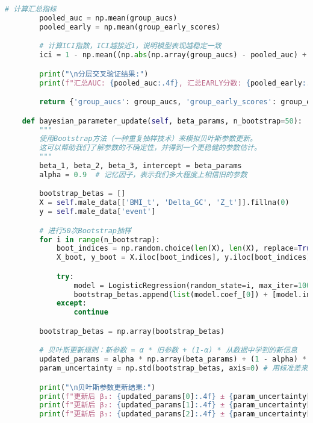 \documentclass[UTF8, a4paper, 11pt]{ctexart}
\begin{document}
\begin{lstlisting}[language=Python, caption={问题三的解决方案脚本。}]
        # 计算汇总指标
        pooled_auc = np.mean(group_aucs)
        pooled_early = np.mean(group_early_scores)

        # 计算ICI指数，ICI越接近1，说明模型表现越稳定一致
        ici = 1 - np.mean((np.abs(np.array(group_aucs) - pooled_auc) + np.abs(np.array(group_early_scores) - pooled_early)) / (pooled_auc + pooled_early))

        print("\n分层交叉验证结果:")
        print(f"汇总AUC: {pooled_auc:.4f}, 汇总EARLY分数: {pooled_early:.4f}, 组间一致性指数(ICI): {ici:.4f}")

        return {'group_aucs': group_aucs, 'group_early_scores': group_early_scores, 'pooled_auc': pooled_auc, 'pooled_early': pooled_early, 'ici': ici}

    def bayesian_parameter_update(self, beta_params, n_bootstrap=50):
        """
        使用Bootstrap方法（一种重复抽样技术）来模拟贝叶斯参数更新。
        这可以帮助我们了解参数的不确定性，并得到一个更稳健的参数估计。
        """
        beta_1, beta_2, beta_3, intercept = beta_params
        alpha = 0.9  # 记忆因子，表示我们多大程度上相信旧的参数

        bootstrap_betas = []
        X = self.male_data[['BMI_t', 'Delta_GC', 'Z_t']].fillna(0)
        y = self.male_data['event']

        # 进行50次Bootstrap抽样
        for i in range(n_bootstrap):
            boot_indices = np.random.choice(len(X), len(X), replace=True)
            X_boot, y_boot = X.iloc[boot_indices], y.iloc[boot_indices]

            try:
                model = LogisticRegression(random_state=i, max_iter=1000).fit(X_boot, y_boot)
                bootstrap_betas.append(list(model.coef_[0]) + [model.intercept_[0]])
            except:
                continue

        bootstrap_betas = np.array(bootstrap_betas)

        # 贝叶斯更新规则：新参数 = α * 旧参数 + (1-α) * 从数据中学到的新信息
        updated_params = alpha * np.array(beta_params) + (1 - alpha) * np.mean(bootstrap_betas, axis=0)
        param_uncertainty = np.std(bootstrap_betas, axis=0) # 用标准差来衡量参数的不确定性

        print("\n贝叶斯参数更新结果:")
        print(f"更新后 β₁: {updated_params[0]:.4f} ± {param_uncertainty[0]:.4f}")
        print(f"更新后 β₂: {updated_params[1]:.4f} ± {param_uncertainty[1]:.4f}")
        print(f"更新后 β₃: {updated_params[2]:.4f} ± {param_uncertainty[2]:.4f}")


\end{lstlisting}
\end{document}
